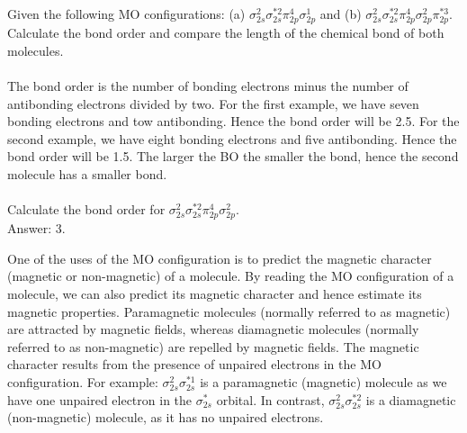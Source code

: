 \documentclass[main.tex]{subfiles}
\begin{document}
\begin{description}
\begin{example} %
Given the following MO configurations: (a) $\sigma^{2}_{2s}\sigma^{*2}_{2s}\pi^{4}_{2p}\sigma^{1}_{2p}$ and (b) $\sigma^{2}_{2s}\sigma^{*2}_{2s}\pi^{4}_{2p}\sigma^{2}_{2p}\pi^{*3}_{2p}$. Calculate the bond order and compare the length of the chemical bond of both molecules.\\ 
\\
The bond order is the number of bonding electrons minus the number of antibonding electrons divided by two. For the first example, we have seven bonding electrons and tow antibonding. Hence the bond order will be 2.5. For the second example, we have eight bonding electrons and five antibonding. Hence the bond order will be 1.5. The larger the BO the smaller the bond, hence the second molecule has a smaller bond.
\\
\faDiamond\ \\
Calculate the bond order for $\sigma^{2}_{2s}\sigma^{*2}_{2s}\pi^{4}_{2p}\sigma^{2}_{2p}$.\\
\flushright Answer: 3.
\end{example}%


\item[\docfilehook{Paramagnetism and diamagnetism}{}] One of the uses of the MO configuration is to predict the magnetic character (magnetic or non-magnetic) of a molecule. By reading the MO configuration of a molecule, we can also predict its magnetic character and hence estimate its magnetic properties. 
Paramagnetic molecules (normally referred to as magnetic) are attracted by magnetic fields, whereas diamagnetic molecules (normally referred to as non-magnetic) are repelled by magnetic fields. The magnetic character results from the presence of unpaired electrons in the MO configuration. For example: $\sigma^{2}_{2s}\sigma^{*1}_{2s}$ is a paramagnetic (magnetic) molecule as we have one unpaired electron in the $\sigma^{*}_{2s}$ orbital. In contrast, $\sigma^{2}_{2s}\sigma^{*2}_{2s}$ is a diamagnetic (non-magnetic) molecule, as it has no unpaired electrons.



\end{description}
\end{document}
